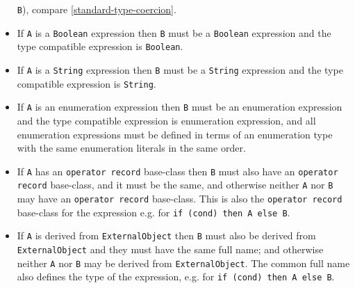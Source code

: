 \begin{itemize}
  \lstinline!B!), compare \autoref{standard-type-coercion}.
\item
  If \lstinline!A! is a \lstinline!Boolean! expression then \lstinline!B! must be a \lstinline!Boolean! expression and
  the type compatible expression is \lstinline!Boolean!.
\item
  If \lstinline!A! is a \lstinline!String! expression then \lstinline!B! must be a \lstinline!String! expression and the
  type compatible expression is \lstinline!String!.
\item
  If \lstinline!A! is an enumeration expression then \lstinline!B! must be an enumeration
  expression and the type compatible expression is enumeration
  expression, and all enumeration expressions must be defined in terms
  of an enumeration type with the same enumeration literals in the same
  order.
\item
  If \lstinline!A! has an \lstinline!operator record! base-class then \lstinline!B! must also have an
  \lstinline!operator record! base-class, and it must be the same, and otherwise
  neither \lstinline!A! nor \lstinline!B! may have an \lstinline!operator record! base-class. This is also
  the \lstinline!operator record! base-class for the expression e.g. for
  \lstinline!if (cond) then A else B!.
\item
  If \lstinline!A! is derived from \lstinline!ExternalObject! then \lstinline!B! must also be derived from
  \lstinline!ExternalObject! and they must have the same full name; and otherwise
  neither \lstinline!A! nor \lstinline!B! may be derived from \lstinline!ExternalObject!. The common full
  name also defines the type of the expression, e.g. for \lstinline!if (cond) then A else B!.
\end{itemize}
